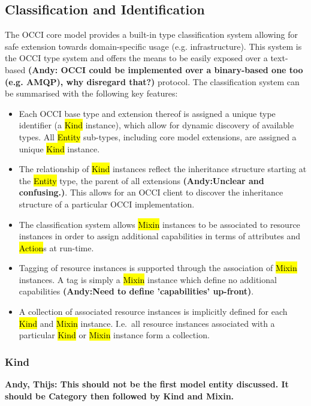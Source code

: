 \documentclass[10pt,a4paper]{article}
\begin{document}
\subsection{Classification and Identification}
\label{sec:classification}
The OCCI core model provides a built-in type classification system allowing for safe
extension towards domain-specific usage (e.g. infrastructure). This system is the OCCI type system
and offers the means to be easily exposed over a text-based 
\textbf{(Andy: OCCI could be implemented over a binary-based one too (e.g. AMQP), why disregard that?)} protocol.
%
The classification system can be summarised with the following key features:
\begin{itemize}
\item Each OCCI base type and extension thereof is assigned a unique type
 identifier (a \hl{Kind} instance), which allow for dynamic discovery of
 available types. All \hl{Entity} sub-types, including core model extensions, are assigned
 a unique \hl{Kind} instance.
\item The relationship of \hl{Kind} instances reflect the inheritance structure
 starting at the \hl{Entity} type, the parent of all extensions \textbf{(Andy:Unclear and confusing.)}. This allows
 for an OCCI client to discover the inheritance structure of a
 particular OCCI implementation.
\item The classification system allows \hl{Mixin} instances to be associated
 to resource instances in order to assign additional capabilities in terms of
 attributes and \hl{Action}s at run-time.
\item Tagging of resource instances is supported through the association
 of \hl{Mixin} instances. A tag is simply a \hl{Mixin} instance which define no
 additional capabilities \textbf{(Andy:Need to define 'capabilities' up-front)}.
\item A collection of associated resource instances is implicitly defined for
 each \hl{Kind} and \hl{Mixin} instance. I.e.~all resource instances associated
 with a particular \hl{Kind} or \hl{Mixin} instance form a collection.
\end{itemize}

\subsubsection{Kind}
\label{sec:kind}
\textbf{Andy, Thijs: This should not be the first model entity discussed.
It should be Category then followed by Kind and Mixin.}
\end{document}
